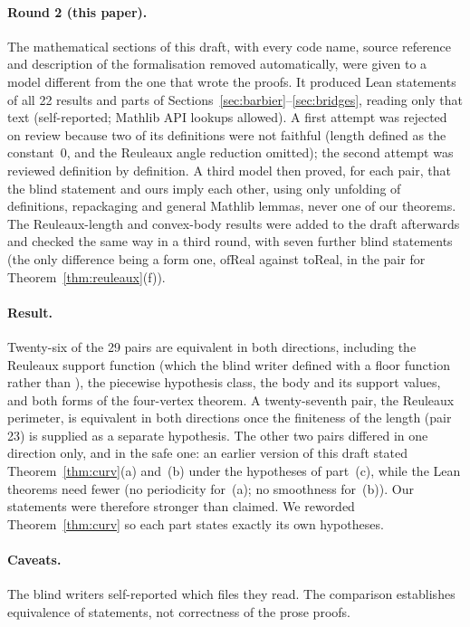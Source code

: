 \documentclass[11pt]{article}
\theoremstyle{definition}
\theoremstyle{remark}
\begin{document}
\paragraph{Round 2 (this paper).} The mathematical sections of this draft, with every code name, source
reference and description of the formalisation removed automatically, were given to a model different
from the one that wrote the proofs. It produced Lean statements of all 22 results and parts of
Sections~\ref{sec:barbier}--\ref{sec:bridges}, reading only that text (self-reported; Mathlib API
lookups allowed). A first attempt was rejected on review because two of its definitions were not
faithful (length defined as the constant~$0$, and the Reuleaux angle reduction omitted); the second
attempt was reviewed definition by definition. A third model then proved, for each pair, that the blind
statement and ours imply each other, using only unfolding of definitions, repackaging and general
Mathlib lemmas, never one of our theorems. The Reuleaux-length and convex-body results were added to
the draft afterwards and checked the same way in a third round, with seven further blind statements
(the only difference being a form one, $\mathrm{ofReal}$ against $\mathrm{toReal}$, in the pair for
Theorem~\ref{thm:reuleaux}(f)).

\paragraph{Result.} Twenty-six of the 29 pairs are equivalent in both directions, including the Reuleaux
support function (which the blind writer defined with a floor function rather than ),
the piecewise hypothesis class, the body and its support values, and both forms of the four-vertex
theorem. A twenty-seventh pair, the Reuleaux perimeter, is equivalent in both directions once the
finiteness of the length (pair 23) is supplied as a separate hypothesis. The other two pairs differed in one direction only, and in the safe one: an earlier version of
this draft stated Theorem~\ref{thm:curv}(a) and~(b) under the hypotheses of part~(c), while the Lean
theorems need fewer (no periodicity for~(a); no smoothness for~(b)). Our statements were therefore
stronger than claimed. We reworded Theorem~\ref{thm:curv} so each part states exactly its own
hypotheses.

\paragraph{Caveats.} The blind writers self-reported which files they read. The comparison establishes
equivalence of statements, not correctness of the prose proofs.
\end{document}
